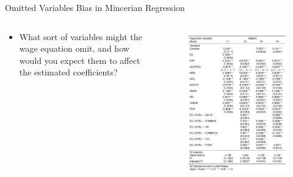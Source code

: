 \begin{frame}{Omitted Variables Bias in Mincerian Regression}
\begin{columns}
\begin{column}{0.5\textwidth}
\begin{itemize}
	\item What sort of variables might the wage equation omit,
		and how would you expect them to affect the estimated
		coefficients?
\end{itemize}
\end{column}
\begin{column}{0.5\textwidth}
\begin{figure}
\flushleft
	\includegraphics [width=.8\textwidth]	{table_1.png}
\end{figure}
\end{column}
\end{columns}	
\end{frame}

